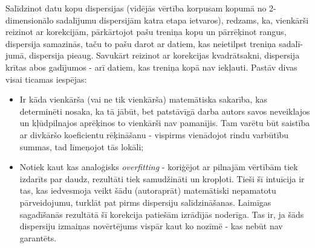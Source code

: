\documentclass[12pt, a4paper]{article}
\numberwithin{equation}{section} %
\begin{document}
Salīdzinot datu kopu dispersijas (vidējās vērtība korpusam kopumā no 2-dimensionālo sadalījumu dispersijām katra etapa ietvaros), redzams, ka, vienkārši reizinot ar korekcijām, pārkārtojot pašu treniņa kopu un pārrēķinot rangus, dispersija samazinās, taču to pašu darot ar datiem, kas neietilpst treniņa sadalī-jumā, dispersija pieaug. Savukārt reizinot ar korekcijas kvadrātsakni, dispersija krītas abos gadījumos - arī datiem, kas treniņa kopā nav iekļauti. Pastāv divas visai ticamas iespējas:

\begin{itemize}
    \item Ir kāda vienkārša (vai ne tik vienkārša) matemātiska sakarība, kas determinēti nosaka, ka tā jābūt, bet patstāvīgā darba autors savos neveiklajos un kļūdpilnajos aprēķinos to vienkārši nav pamanījis. Tam varētu būt saistība ar divkāršo koeficientu rēķināšanu - vispirms vienādojot rindu varbūtību summas, tad līmeņojot tās lokāli;
    \item Notiek kaut kas analoģisks \textit{overfitting} - koriģējot ar pilnajām vērtībām tiek izdarīts par daudz, rezultāti tiek samudžināti un kropļoti. Tieši šī intuīcija ir tas, kas iedvesmoja veikt šādu (autoraprāt) matemātiski nepamatotu pārveidojumu, turklāt pat pirms dispersiju salīdzināšanas. Laimīgas sagadīšanās rezultātā šī korekcija patiešām izrādījās noderīga. Tas ir, ja šāds dispersiju izmaiņas novērtējums vispār kaut ko nozīmē - kas nebūt nav garantēts.
\end{itemize}
\end{document}
